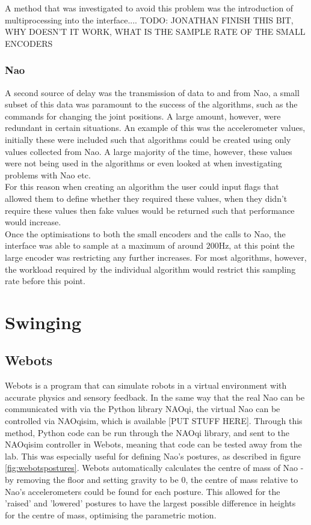 \documentclass[11pt]{article}
\newcommand*\ruleline[1]{\par\noindent\raisebox{.8ex}{\makebox[\linewidth]{\hrulefill\hspace{1ex}\raisebox{-.8ex}{#1}\hspace{1ex}\hrulefill}}}
\begin{document}
A method that was investigated to avoid this problem was the introduction of multiprocessing into the interface....
TODO: JONATHAN FINISH THIS BIT, WHY DOESN'T IT WORK, WHAT IS THE SAMPLE RATE OF THE SMALL ENCODERS

\subsubsection{Nao}
\ruleline{George Sheppard}
A second source of delay was the transmission of data to and from Nao, a small subset of this data was paramount to the success of the algorithms, such as the commands for changing the joint positions. A large amount, however, were redundant in certain situations. An example of this was the accelerometer values, initially these were included such that algorithms could be created using only values collected from Nao. A large majority of the time, however, these values were not being used in the algorithms or even looked at when investigating problems with Nao etc.\\

For this reason when creating an algorithm the user could input flags that allowed them to define whether they required these values, when they didn't require these values then fake values would be returned such that performance would increase.\\

Once the optimisations to both the small encoders and the calls to Nao, the interface was able to sample at a maximum of around $200$Hz, at this point the large encoder was restricting any further increases. For most algorithms, however, the workload required by the individual algorithm would restrict this sampling rate before this point. 

\section{Swinging}

\subsection{Webots}
\ruleline{James Doering}
Webots is a program that can simulate robots in a virtual environment with accurate physics and sensory feedback. In the same way that the real Nao can be communicated with via the Python library NAOqi, the virtual Nao can be controlled via NAOqisim, which is available [PUT STUFF HERE]. Through this method, Python code can be run through the NAOqi library, and sent to the NAOqisim controller in Webots, meaning that code can be tested away from the lab. This was especially useful for defining Nao's postures, as described in figure \ref{fig:webotspostures}. Webots automatically calculates the centre of mass of Nao - by removing the floor and setting gravity to be 0, the centre of mass relative to Nao's accelerometers could be found for each posture. This allowed for the 'raised' and 'lowered' postures to have the largest possible difference in heights for the centre of mass, optimising the parametric motion.\\
\end{document}
